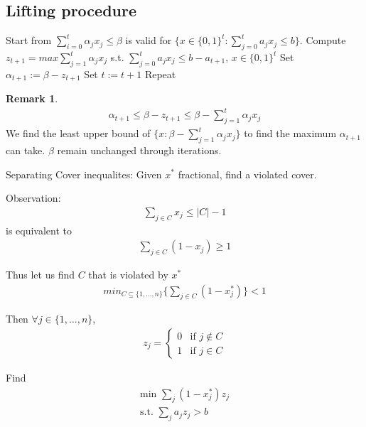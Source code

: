 \documentclass{article}
\theoremstyle{plain}
\theoremstyle{definition}
\newtheorem{rmk}{Remark}
\begin{document}
\subsection{Lifting procedure}
\begin{algorithmic}[1]
    \State  Start from $\sum_{i=0}^{t}\alpha_jx_j \leq\beta$ is valid for
        $\{x\in\{0,1\}^t: \sum_{j=0}^t a_jx_j\leq b\}$.
    \State Compute $z_{t+1} = max\sum^t_{j=1}\alpha_jx_j$ s.t.
        $\sum_{j=0}^t a_jx_j \leq b - a_{t+1}$, $x\in\{0,1\}^t$
    \State Set $\alpha_{t+1} := \beta - z_{t+1}$
    \State Set $t := t+1$
    \State Repeat
\end{algorithmic}

\begin{rmk}
    \begin{gather*}
        \alpha_{t+1}\leq\beta-z_{t+1}\leq\beta-\sum_{j=1}^t\alpha_jx_j
    \end{gather*}
    We find the least upper bound of $\{x: \beta-\sum^t_{j=1}\alpha_jx_j\}$ to find the
    maximum $\alpha_{t+1}$ can take. $\beta$ remain unchanged through iterations.
\end{rmk}

Separating Cover inequalites: Given $x^*$ fractional, find a violated cover.

Observation:
\begin{align*}
    \sum_{j\in C} x_j \leq |C| -1
\end{align*}
is equivalent to
\begin{gather*}
    \sum_{j\in C}(1-x_j) \geq 1
\end{gather*}

Thus let us find $C$ that is violated by $x^*$
\begin{gather*}
    min_{C\subseteq \{1,...,n\}}\{\sum_{j\in C} (1-x^*_j)\} < 1
\end{gather*}

Then $\forall j\in\{1,...,n\}$,
\begin{gather*}
    z_j =
    \begin{cases}
        0 &\text{if } j\not\in C\\
        1 &\text{if } j\in C
    \end{cases}
\end{gather*}

Find
\begin{gather*}
    \text{min } \sum_j(1-x^*_j)z_j\\
    \text{s.t. } \sum_ja_jz_j > b\\
\end{gather*}
\end{document}
